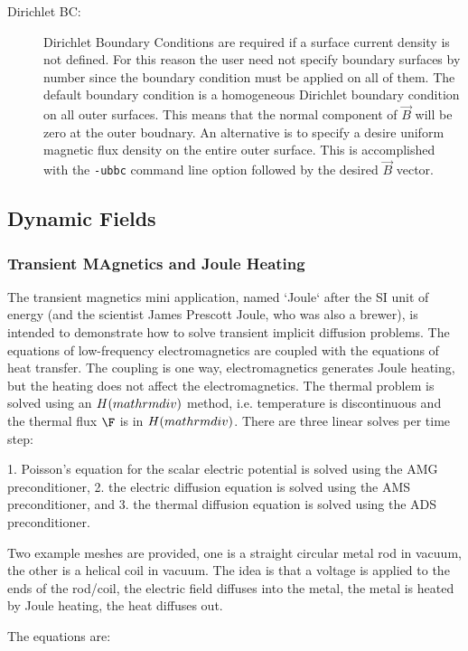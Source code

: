 \documentclass{article}
\begin{document}
\begin{description}
\item[Dirichlet BC:] Dirichlet Boundary Conditions are required if a
  surface current density is not defined.  For this reason the user
  need not specify boundary surfaces by number since the boundary
  condition must be applied on all of them.  The default boundary
  condition is a homogeneous Dirichlet boundary condition on all outer
  surfaces.  This means that the normal component of $\vec{B}$ will be
  zero at the outer boudnary.  An alternative is to specify a desire
  uniform magnetic flux density on the entire outer surface.  This is
  accomplished with the {\tt -ubbc} command line option followed by
  the desired $\vec{B}$ vector.
\end{description}


\subsection{Dynamic Fields}
\subsubsection{Transient MAgnetics and Joule Heating}
The transient magnetics mini application, named `Joule` after the SI unit of energy (and the
scientist James Prescott Joule, who was also a brewer), is intended to demonstrate how to solve
transient implicit diffusion problems. The equations of low-frequency electromagnetics are coupled
with the equations of heat transfer. The coupling is one way, electromagnetics generates Joule
heating, but the heating does not affect the electromagnetics.  The thermal problem
is solved using an $H(\\mathrm{div})$ method, i.e. temperature is discontinuous and the
thermal flux $\F$ is in $H(\\mathrm{div})$.
There are three linear solves per time step:

1. Poisson's equation for the scalar electric potential is solved using the AMG
 preconditioner,
2. the electric diffusion equation is solved using the AMS preconditioner, and
3. the thermal diffusion equation is solved using the ADS preconditioner.

Two example meshes are provided, one is a straight circular metal rod in vacuum, the other is a helical
coil in vacuum. The idea is that a voltage is applied to the ends of the rod/coil, the electric field diffuses
into the metal, the metal is heated by Joule heating, the heat diffuses out.

The equations are:
\end{document}
